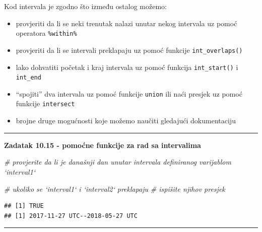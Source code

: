 \documentclass[]{book}
\newenvironment{Shaded}{\begin{snugshade}}{\end{snugshade}}
\newcommand{\KeywordTok}[1]{\textcolor[rgb]{0.13,0.29,0.53}{\textbf{#1}}}
\newcommand{\StringTok}[1]{\textcolor[rgb]{0.31,0.60,0.02}{#1}}
\newcommand{\CommentTok}[1]{\textcolor[rgb]{0.56,0.35,0.01}{\textit{#1}}}
\newcommand{\ControlFlowTok}[1]{\textcolor[rgb]{0.13,0.29,0.53}{\textbf{#1}}}
\newcommand{\OperatorTok}[1]{\textcolor[rgb]{0.81,0.36,0.00}{\textbf{#1}}}
\newcommand{\NormalTok}[1]{#1}
\providecommand{\tightlist}{%
  \setlength{\itemsep}{0pt}\setlength{\parskip}{0pt}}
\theoremstyle{definition}
\theoremstyle{definition}
\theoremstyle{definition}
\theoremstyle{remark}
\begin{document}
Kod intervala je zgodno što između ostalog možemo:

\begin{itemize}
\tightlist
\item
  provjeriti da li se neki trenutak nalazi unutar nekog intervala uz
  pomoć operatora \texttt{\%within\%}
\item
  provjeriti da li se intervali preklapaju uz pomoć funkcije
  \texttt{int\_overlaps()}
\item
  lako dohvatiti početak i kraj intervala uz pomoć funkcija
  \texttt{int\_start()} i \texttt{int\_end}
\item
  ``spojiti'' dva intervala uz pomoć funkcije \texttt{union} ili naći
  presjek uz pomoć funkcije \texttt{intersect}
\item
  brojne druge mogućnosti koje možemo naučiti gledajući dokumentaciju
\end{itemize}

\begin{center}\rule{0.5\linewidth}{\linethickness}\end{center}

\textbf{Zadatak 10.15 - pomoćne funkcije za rad sa intervalima}

\begin{Shaded}
\begin{Highlighting}[]
\CommentTok{# provjerite da li je današnji dan unutar intervala definiranog varijablom `interval1`}

\CommentTok{# ukoliko se `interval1` i `interval2` preklapaju}
\CommentTok{# ispišite njihov presjek}
\end{Highlighting}
\end{Shaded}

\begin{Shaded}
\end{Shaded}

\begin{verbatim}
## [1] TRUE
## [1] 2017-11-27 UTC--2018-05-27 UTC
\end{verbatim}

\begin{center}\rule{0.5\linewidth}{\linethickness}\end{center}
\end{document}
